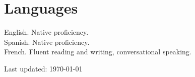 \documentclass[12pt]{article} %
\begin{document}
\section*{Languages}

English. Native proficiency.\\
Spanish. Native proficiency.\\
French. Fluent reading and writing, conversational speaking.

\vfill{} %


\begin{center}
  {\scriptsize Last updated: \today} %
\end{center}

\end{document}
